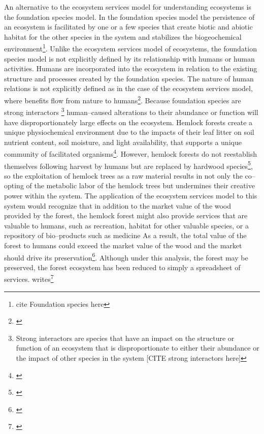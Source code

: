 \documentclass{article}
\begin{document}
{An alternative to the ecosystem services model for understanding ecosystems is the foundation species model. In the foundation species model the persistence of an ecosystem is facilitated by one or a few species that create biotic and abiotic habitat for the other species in the system and stabilizes the biogeochemical environment\footnote{cite Foundation species here}. Unlike the ecosystem services model of ecosystems, the foundation species model is not explicitly defined by its relationship with humans or human activities. Humans are incorporated into the ecosystem in relation to the existing structure and processes created by the foundation species. The nature of human relations is not explicitly defined as in the case of the ecosystem services model, where benefits flow from nature to humans\footnote{\cite{costanza_value_1998}}. Because foundation species are strong interactors
\footnote{Strong interactors are species that have an impact on the structure or function of an ecosystem that is disproportionate to either their abundance or the impact of other species in the system [CITE strong interactors here]}
human--caused alterations to their abundance or function will have disproportionately large effects on the ecosystem. Hemlock forests create a unique physiochemical environment due to the impacts of their leaf litter on soil nutrient content, soil moisture, and light availability, that supports a unique community of facilitated organisms\footnote{\cite{ellison_2005}}. However, hemlock forests do not reestablish themselves following harvest by humans but are replaced by hardwood species\footnote{\cite{ellison_2005}}, so the exploitation of hemlock trees as a raw material results in not only the co--opting of the metabolic labor of the hemlock trees but undermines their creative power within the system. The application of the ecosystem services model to this system would recognize that in addition to the market value of the wood provided by the forest, the hemlock forest might also provide services that are valuable to humans, such as recreation, habitat for other valuable species, or a repository of bio--products such as medicine
As a result, the total value of the forest to humans could exceed the market value of the wood and the market should drive its preservation\footnote{\cite{costanza_value_1998}}. Although under this analysis, the forest may be preserved, the forest ecosystem has been reduced to simply a spreadsheet of services. \citeauthor{battistoni_bringing_2017} writes\footnote{\cite[p. 11]{battistoni_bringing_2017}}

}
\end{document}
